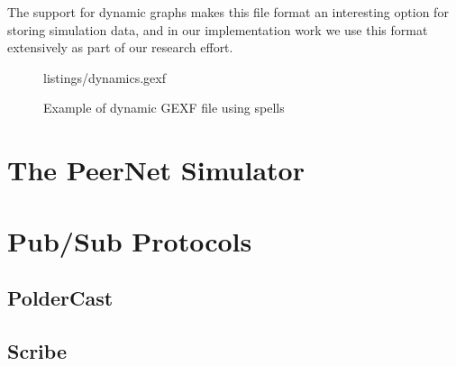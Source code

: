 The support for dynamic graphs makes this file format an interesting
option for storing simulation data, and in our implementation work we
use this format extensively as part of our research effort.

\begin{figure}
 {listings/dynamics.gexf}
\caption{Example of  dynamic GEXF file using spells}
\end{figure}

\section{The PeerNet Simulator}

\section{Pub/Sub Protocols}
\subsection{PolderCast}
\subsection{Scribe}

